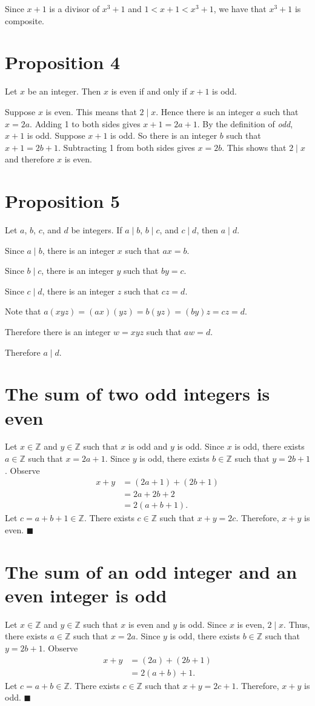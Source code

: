 \documentclass[12pt]{article}
\begin{document}
Since $x+1$ is a divisor of $x^3+1$ and $1<x+1<x^3+1$, we have that $x^3+1$ is composite.
\section*{Proposition 4}
Let $x$ be an integer. Then $x$ is even if and only if $x+1$ is odd.

Suppose $x$ is even. This means that $2 \mid x$. Hence there is an integer $a$ such that $x=2a$. Adding 1 to both sides gives $x+1=2a+1$. By the definition of \textit{odd}, $x+1$ is odd.
Suppose $x+1$ is odd. So there is an integer $b$ such that $x+1=2b+1$. Subtracting 1 from both sides gives $x=2b$. This shows that $2 \mid x$ and therefore $x$ is even.
\section*{Proposition 5}
Let $a$, $b$, $c$, and $d$ be integers. If $a \mid b$, $b \mid c$, and $c \mid d$, then $a \mid d$.

Since $a \mid b$, there is an integer $x$ such that $ax=b$.

Since $b \mid c$, there is an integer $y$ such that $by=c$.

Since $c \mid d$, there is an integer $z$ such that $cz=d$.

Note that $a(xyz)=(ax)(yz)=b(yz)=(by)z=cz=d$.

Therefore there is an integer $w=xyz$ such that $aw=d$.

Therefore $a \mid d$.
\section{The sum of two odd integers is even}
Let $x\in\mathbb{Z}$ and $y\in\mathbb{Z}$ such that $x$ is odd and $y$ is odd. Since $x$ is odd, there exists $a\in\mathbb{Z}$ such that $x=2a+1$. Since $y$ is odd, there exists $b\in\mathbb{Z}$ such that $y=2b+1$. Observe
\begin{align*}
x+y
&=(2a+1)+(2b+1)\\
&=2a+2b+2\\
&=2(a+b+1).
\end{align*}
Let $c=a+b+1\in\mathbb{Z}$. There exists $c\in\mathbb{Z}$ such that $x+y=2c$. Therefore, $x+y$ is even. $\blacksquare$
\section{The sum of an odd integer and an even integer is odd}
Let $x\in\mathbb{Z}$ and $y\in\mathbb{Z}$ such that $x$ is even and $y$ is odd. Since $x$ is even, $2 \mid x$. Thus, there exists $a\in\mathbb{Z}$ such that $x=2a$. Since $y$ is odd, there exists $b\in\mathbb{Z}$ such that $y=2b+1$. Observe
\begin{align*}
x+y
&=(2a)+(2b+1)\\
&=2(a+b)+1.
\end{align*}
Let $c=a+b\in\mathbb{Z}$. There exists $c\in\mathbb{Z}$ such that $x+y=2c+1$. Therefore, $x+y$ is odd. $\blacksquare$
\end{document}
